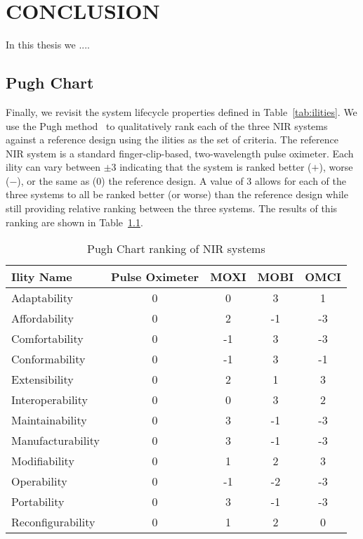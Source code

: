 \chapter{CONCLUSION} %
\label{chap:conclusion}

In this thesis we ....

\section{Pugh Chart}

Finally, we revisit the system lifecycle properties defined in Table~\ref{tab:ilities}. We use the Pugh method~\cite{Pugh1981} to qualitatively rank each of the three \ac{NIR} systems against a reference design using the ilities as the set of criteria. The reference \ac{NIR} system is a standard finger-clip-based, two-wavelength pulse oximeter. Each ility can vary between $\pm3$ indicating that the system is ranked better ($+$), worse ($-$), or the same as ($0$) the reference design. A value of 3 allows for each of the three systems to all be ranked better (or worse) than the reference design while still providing relative ranking between the three systems. The results of this ranking are shown in Table~\ref{tab:pughtable}. 

\begin{table}[]
\centering
\caption{Pugh Chart ranking of \ac{NIR} systems}
\label{tab:pughtable}
\begin{tabular}{@{}lcccc@{}}
\toprule
Ility Name        & Pulse Oximeter & MOXI & MOBI & OMCI \\ \midrule
Adaptability      & 0              & 0    & 3    & 1    \\
Affordability     & 0              & 2    & -1   & -3   \\
Comfortability    & 0              & -1   & 3    & -3   \\
Conformability    & 0              & -1   & 3    & -1   \\
Extensibility     & 0              & 2    & 1    & 3    \\
Interoperability  & 0              & 0    & 3    & 2    \\
Maintainability   & 0              & 3    & -1   & -3   \\
Manufacturability & 0              & 3    & -1   & -3   \\
Modifiability     & 0              & 1    & 2    & 3    \\
Operability       & 0              & -1   & -2   & -3   \\
Portability       & 0              & 3    & -1   & -3   \\
Reconfigurability & 0              & 1    & 2    & 0    \\ \bottomrule
\end{tabular}%
\end{table}

